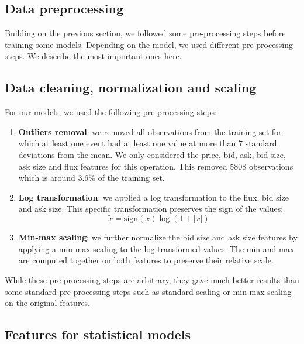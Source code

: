 \documentclass[switch, 11pt]{article}
\begin{document}
\begin{multicols}{2}

    \section{Data preprocessing}

    Building on the previous section, we followed some pre-processing steps before training some models. Depending on the model, we used different pre-processing steps. We describe the most important ones here.

    \subsection{Data cleaning, normalization and scaling}

    For our models, we used the following pre-processing steps:
    \begin{enumerate}
        \item \textbf{Outliers removal}: we removed all observations from the training set for which at least one event had at least one value at more than $7$ standard deviations from the mean. We only considered the price, bid, ask, bid size, ask size and flux features for this operation. This removed $5808$ observations which is around $3.6\%$ of the training set.
        \item \textbf{Log transformation}: we applied a log transformation to the flux, bid size and ask size. This specific transformation preserves the sign of the values:
              $$\tilde{x}= \text{sign}(x)\log(1+|x|)$$
        \item \textbf{Min-max scaling}: we further normalize the bid size and ask size features by applying a min-max scaling to the log-transformed values. The min and max are computed together on both features to preserve their relative scale.
    \end{enumerate}

    While these pre-processing steps are arbitrary, they gave much better results than some standard pre-processing steps such as standard scaling or min-max scaling on the original features.

    \subsection{Features for statistical models}


\end{multicols}
\end{document}
